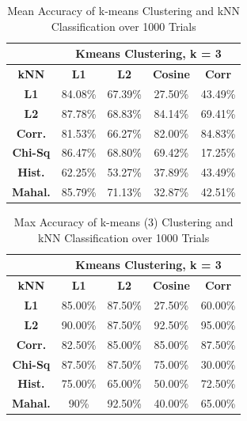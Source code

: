 \documentclass[10pt,twocolumn,letterpaper]{article}
\begin{document}
\vspace{2mm}

\begin{table}[H]
\caption{Mean Accuracy of k-means Clustering and kNN Classification over 1000 Trials \label{tab:kmeans3}}
\small
\begin{center}
\begin{tabular}{|c| c c c c|}
\cline{2-5}
\multicolumn{1}{c|}{ } & \multicolumn{4}{|c|}{\bf Kmeans Clustering, k = 3} \\
\hline

\bf kNN &\bf L1 &\bf L2 &\bf Cosine &\bf Corr \\ [0.5ex]
\hline
\bf L1 & 84.08\% & 67.39\%  & 27.50\% & 43.49\%\\ [0.5ex]
\hline
\bf L2 & 87.78\% & 68.83\%  & 84.14\% & 69.41\%\\ [0.5ex]
\hline
\bf Corr. & 81.53\% & 66.27\%  & 82.00\% & 84.83\%\\ [0.5ex]
\hline
\bf Chi-Sq & 86.47\% & 68.80\%  & 69.42\% & 17.25\%\\ [0.5ex]
\hline
\bf Hist. & 62.25\% & 53.27\%  & 37.89\% & 43.49\%\\ [0.5ex]
\hline
\bf Mahal. & 85.79\% & 71.13\% & 32.87\% & 42.51\% \\ [0.5ex]
\hline
\end{tabular}
\end{center}
\end{table}

\begin{table}[H]
\caption{Max Accuracy of k-means (3) Clustering and kNN Classification over 1000 Trials \label{tab:kmeans_3max}}
\small
\begin{center}
\begin{tabular}{|c| c c c c|}
\cline{2-5}
\multicolumn{1}{c|}{ } & \multicolumn{4}{|c|}{\bf Kmeans Clustering, k = 3} \\
\hline
\bf kNN &\bf L1 &\bf L2 &\bf Cosine &\bf Corr \\ [0.5ex]
\hline
\bf L1 & 85.00\% & 87.50\%  & 27.50\% & 60.00\%\\ [0.5ex]
\hline
\bf L2 & 90.00\% & 87.50\%  & 92.50\% & 95.00\%\\ [0.5ex]
\hline
\bf Corr. & 82.50\% & 85.00\%  & 85.00\% & 87.50\%\\ [0.5ex]
\hline
\bf Chi-Sq & 87.50\% & 87.50\%  & 75.00\% & 30.00\%\\ [0.5ex]
\hline
\bf Hist. & 75.00\% & 65.00\%  & 50.00\% & 72.50\%\\ [0.5ex]
\hline
\bf Mahal. & 90\% & 92.50\% & 40.00\% & 65.00\%\\ [0.5ex]
\hline
\end{tabular}
\end{center}
\end{table}
\end{document}
